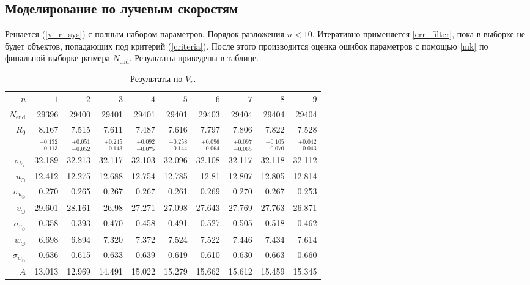 \documentclass{matmex-diploma-custom}
\begin{document}
\pagebreak
\subsection{Моделирование по лучевым скоростям}
Решается (\ref{v_r_sys}) с полным набором параметров. Порядок разложения $n < 10$. Итеративно применяется \ref{err_filter}, пока в выборке не будет объектов, попадающих под критерий (\ref{criteria}). После этого производится оценка ошибок параметров с помощью \ref{mk} по финальной выборке размера $N_{\mathrm{end}}$. Результаты приведены в таблице. 
\begin{table}[h!!]
\centering
\caption{Результаты по $V_r$.}
\begin{tabular}{r|rr|r|rrrrrr}
\hline
 $n$ & $1$ & $2$ & $3$ & $4$ & $5$&$ 6 $&$ 7 $&$ 8 $&$ 9 $\\
 $N_{\mathrm{end}}$ & 29396       &   29400 &   29401 &   29401 &   29401 &   29403 &   29404 &   29404 &   29404  \\
 $R_0 $& 8.167       &   7.515 &   7.611 &   7.487 &   7.616 &   7.797 &   7.806 &   7.822 &   7.528  \\
       & $_{-0.113}^{+0.132} $ & $_{-0.052}^{+0.051}$  & $_{-0.143}^{+0.245}$   & $_{-0.075}^{+0.092}$  & $_{-0.144}^{+0.258}$  & $_{-0.064}^{+0.096}$  & $_{-0.065}^{+0.097}$  & $_{-0.070}^{+0.105}$  & $_{-0.043}^{+0.042}$  \\\hline
 $\sigma_{V_r} $& 32.189      &  32.213 &  32.117 &  32.103 &  32.096 &  32.108 &  32.117 &  32.118 &  32.112  \\
 $ u_{\odot} $& 12.412      &  12.275 &  12.688 &  12.754 &  12.785 &   12.81 &  12.807 &  12.805 &  12.814  \\
 $\sigma_{u_{\odot}} $&0.270       &   0.265 &   0.267 &   0.267 &   0.261 &   0.269 &    0.270 &   0.267 &   0.253  \\
 $v_{\odot} $& 29.601      &  28.161 &   26.98 &  27.271 &  27.098 &  27.643 &  27.769 &  27.763 &  26.871  \\
 $\sigma_{v_{\odot}}$&0.358       &   0.393 &    0.470 &   0.458 &   0.491 &   0.527 &   0.505 &   0.518 &   0.462  \\
 $w_{\odot} $&6.698       &   6.894 &    7.320 &   7.372 &   7.524 &   7.522 &   7.446 &   7.434 &   7.614  \\
 $\sigma_{w_{\odot}} $& 0.636       &   0.615 &   0.633 &   0.639 &   0.619 &    0.610 &    0.630 &   0.663 &    0.660  \\\hline
 $A $&13.013      &  12.969 &  14.491 &  15.022 &  15.279 &  15.662 &  15.612 &  15.459 &  15.345  \\

\end{tabular}
\end{table}
\end{document}
